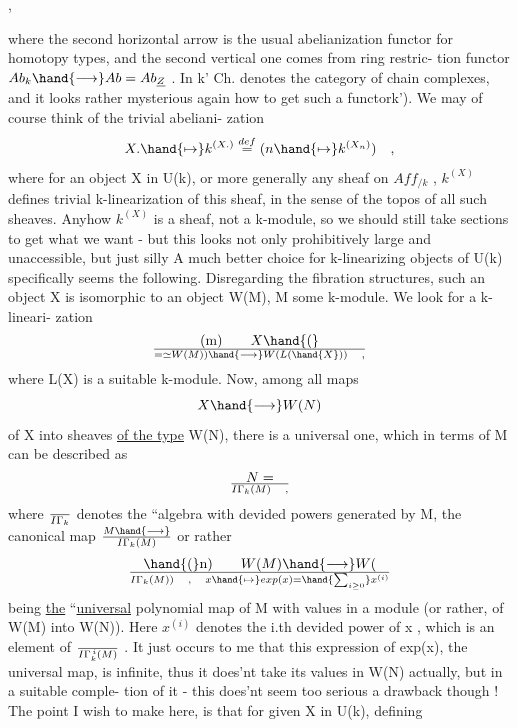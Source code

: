 
,

where the second horizontal arrow is the usual abelianization functor
for homotopy types,  and the second vertical one comes from ring restric-%
tion functor  $Ab_k \hand{\longrightarrow} Ab = Ab_{\underline{Z}}$ .  In \hand{(}k'\hand{),} Ch.  denotes the category
of chain complexes,  and it looks rather mysterious again how to get
such a functor\hand{(}k').   We may of course think of the trivial abeliani-%
zation
\[ X. \hand{\mapsto} k^{(X.)} \stackrel{def}{=} (n \hand{\mapsto} k^{(X_n)} ) \quad , \]
where for an object X in U(k),  or more generally any sheaf on $Aff_{/k}$ ,
$k^{(X)}$ defines trivial k-linearization of this sheaf,  in the sense of the
topos of all such sheaves.  Anyhow $k^{(X)}$ is a sheaf,  not a k-module,
so we should still take sections to get what we want  -  but this  looks
not only prohibitively large and unaccessible,  but just silly\hand{!}  A much
better choice for k-linearizing objects of U(k) specifically seems the
following.  Disregarding the fibration structures,  such an object X is
isomorphic to an object W(M),  M some k-module.  We look for a k-lineari-%
zation
\[ \text{(m)} \qquad X \hand{(}\over{=}{\simeq}W(M)) \hand{\longrightarrow} W(L(\hand{X})) \quad , \]
where L(X) is a suitable k-module.  Now,  among all maps
\[ X \hand{\longrightarrow} W(N) \]
 of X into sheaves \uline{of the type} W(N),  there is a universal one,  which
in terms of M can be described as
\[ N = \over{I}{\Gamma}_k(M) \quad , \]
where $\over{I}{\Gamma}_k$  denotes the ``algebra with devided powers generated by M,
the canonical map  $M \hand{\longrightarrow} \over{I}{\Gamma}_k(M)$  or rather
\[ \hand{(}\text{n}) \qquad W(M) \hand{\longrightarrow} W(\over{I}{\Gamma}_k(M)) \quad , \quad x \hand{\mapsto} exp(x) = \hand{\sum_{i\geq 0}} x^{(i)} \]
being \uline{the} ``\uline{universal} polynomial map  of M with values in a module 
(or rather,  of W(M) into W(N)).   Here  $x^{(i)}$ denotes the i.th devided
power of x ,  which is an element of  $\over{I}{\Gamma}_k^{\,i}(M)$ .  It just occurs to me
that this expression of exp(x),  the universal map,  is infinite,  thus
it does'nt take its values in W(N)  actually,  but in a suitable comple-%
tion of it - this does'nt seem too serious a drawback though !  The
point I wish to make here,  is that for given X in U(k),  defining

